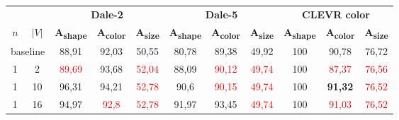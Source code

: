 \begin{table}[ht]
    \centering
    \begin{tabular}{cc|ccc|ccc|ccc}
        \toprule
                                      &         & \multicolumn{3}{c}{\textbf{Dale-2}} & \multicolumn{3}{c}{\textbf{Dale-5}} & \multicolumn{3}{c}{\textbf{CLEVR color}}                                                                                                                                                                                                           \\  \cmidrule(lr){3-5}\cmidrule(lr){6-8}\cmidrule(lr){9-11}
        $n$                           & $|V|$   & \textbf{A\textsubscript{shape}}     & \textbf{A\textsubscript{color}}     & \textbf{A\textsubscript{size}}           & \textbf{A\textsubscript{shape}} & \textbf{A\textsubscript{color}} & \textbf{A\textsubscript{size}} & \textbf{A\textsubscript{shape}} & \textbf{A\textsubscript{color}} & \textbf{A\textsubscript{size}} \\\midrule
        \multicolumn{2}{c|}{baseline} & {88,91} & {92,03}                             & {50,55}                             & {80,78}                                  & {89,38}                         & {49,92}                         & {100}                          & {90,78}                         & {76,72}                                                          \\\midrule
        {1}                           & {2}     & \textcolor{red}{89,69}              & {93,68}                             & \textcolor{red}{52,04}                   & {88,09}                         & \textcolor{red}{90,12}          & \textcolor{red}{49,74}         & {100}                           & \textcolor{red}{87,37}          & \textcolor{red}{76,56}         \\
        {1}                           & {10}    & {96,31}                             & {94,21}                             & \textcolor{red}{52,78}                   & {90,6}                          & \textcolor{red}{90,15}          & \textcolor{red}{49,74}         & {100}                           & \textbf{91,32}                  & \textcolor{red}{76,52}         \\
        {1}                           & {16}    & {94,97}                             & \textcolor{red}{92,8}               & \textcolor{red}{52,78}                   & {91,97}                         & {93,45}                         & \textcolor{red}{49,74}         & {100}                           & \textcolor{red}{91,03}          & \textcolor{red}{76,52}         \\

\end{tabular}
\end{table}
